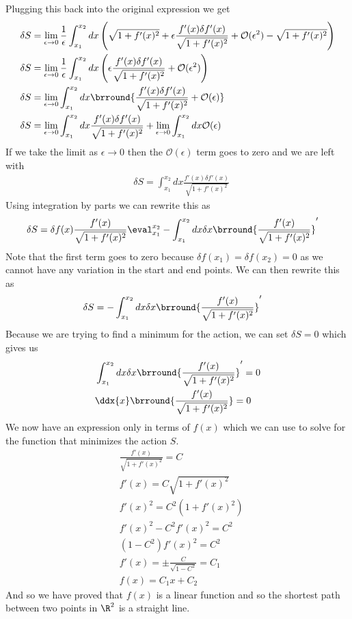 Plugging this back into the original expression we get
\begin{align*}
    &\delta S=\lim_{\epsilon\to0}\frac{1}{\epsilon} \int_{x_1}^{x_2}dx\left(\sqrt{1+f'(x)^2}+\epsilon\frac{f'(x)\delta f'(x)}{\sqrt{1+f'(x)^2}}+\mathcal{O}(\epsilon^2)-\sqrt{1+f'(x)^2}\right)\\
    &\delta S=\lim_{\epsilon\to0}\frac{1}{\epsilon} \int_{x_1}^{x_2}dx\left(\epsilon\frac{f'(x)\delta f'(x)}{\sqrt{1+f'(x)^2}}+\mathcal{O}(\epsilon^2)\right)\\
    &\delta S=\lim_{\epsilon\to0}\int_{x_1}^{x_2}dx\brround{\frac{f'(x)\delta f'(x)}{\sqrt{1+f'(x)^2}}+\mathcal{O}(\epsilon)}\\
    &\delta S=\lim_{\epsilon\to0}\int_{x_1}^{x_2}dx\frac{f'(x)\delta f'(x)}{\sqrt{1+f'(x)^2}}+\lim_{\epsilon\to0}\int_{x_1}^{x_2}dx\mathcal{O}(\epsilon)
\end{align*}
If we take the limit as $\epsilon\to0$ then the $\mathcal{O}(\epsilon)$ term goes to zero and we are left with
\begin{align*}
    &\delta S=\int_{x_1}^{x_2}dx\frac{f'(x)\delta f'(x)}{\sqrt{1+f'(x)^2}}
\end{align*}
Using integration by parts we can rewrite this as
\begin{align*}
    &\delta S=\delta f(x)\frac{f'(x)}{\sqrt{1+f'(x)^2}}\eval_{x_1}^{x_2}-\int_{x_1}^{x_2}dx\delta x\brround{\frac{f'(x)}{\sqrt{1+f'(x)^2}}}'
\end{align*}
Note that the first term goes to zero because $\delta f(x_1)=\delta f(x_2)=0$ as we cannot have any variation in the start and end points. We can then rewrite this as
\begin{align*}
    &\delta S=-\int_{x_1}^{x_2}dx\delta x\brround{\frac{f'(x)}{\sqrt{1+f'(x)^2}}}'
\end{align*}
Because we are trying to find a minimum for the action, we can set $\delta S=0$ which gives us
\begin{align*}
    &\int_{x_1}^{x_2}dx\delta x\brround{\frac{f'(x)}{\sqrt{1+f'(x)^2}}}'=0\\
    &\ddx{x}\brround{\frac{f'(x)}{\sqrt{1+f'(x)^2}}}=0
\end{align*}
We now have an expression only in terms of $f(x)$ which we can use to solve for the function that minimizes the action $S$.
\begin{align*}
    &\frac{f'(x)}{\sqrt{1+f'(x)^2}}=C\\
    &f'(x)=C\sqrt{1+f'(x)^2}\\
    &f'(x)^2=C^2(1+f'(x)^2)\\
    &f'(x)^2-C^2f'(x)^2=C^2\\
    &(1-C^2)f'(x)^2=C^2\\
    &f'(x)=\pm\frac{C}{\sqrt{1-C^2}}=C_1\\
    &f(x)=C_1x+C_2
\end{align*}
And so we have proved that $f(x)$ is a linear function and so the shortest path between two points in $\R^2$ is a straight line.\\

